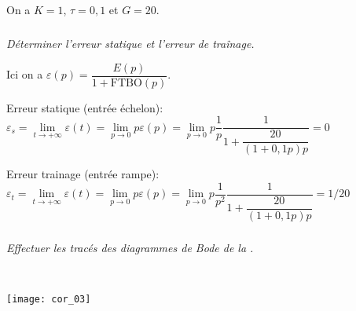 \begin{multicols}{2}
On a $K=1$, $\tau = 0,1$ et $G=20$. 
%
%
%
%

\subparagraph{}\textit{Déterminer l'erreur statique et l'erreur de traînage.}

\ifprof
\begin{corrige}
Ici on a $\varepsilon(p)=\dfrac{E(p)}{1+{\text{FTBO}}(p)}$. 

Erreur statique (entrée échelon): $\varepsilon_s 
= \lim\limits_{t\to +\infty} \varepsilon(t)
= \lim\limits_{p\to 0} p\varepsilon(p)
= \lim\limits_{p\to 0} p \dfrac{1}{p}\dfrac{1}{1+\dfrac{20}{(1+0,1p)p}}=0$

Erreur trainage (entrée rampe): $\varepsilon_t
= \lim\limits_{t\to +\infty} \varepsilon(t)
= \lim\limits_{p\to 0} p\varepsilon(p)
= \lim\limits_{p\to 0} p \dfrac{1}{p^2}\dfrac{1}{1+\dfrac{20}{(1+0,1p)p}}=1/20$
\end{corrige}
\else
\fi


\subparagraph{}\textit{Effectuer les tracés des diagrammes de Bode de la {}.}
\ifprof
\begin{corrige}~\\


\begin{center}
\texttt{[image: cor\_03]}
\end{center}
\end{corrige}
\else
\fi



\end{multicols}
